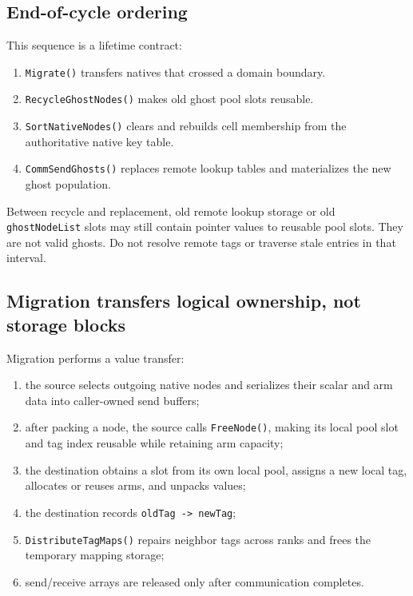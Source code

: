 \documentclass[11pt]{article}
\newcommand{\code}[1]{\texorpdfstring{\nolinkurl{#1}}{#1}}
\begin{document}
\subsection{End-of-cycle ordering}



This sequence is a lifetime contract:

\begin{enumerate}
\item \code{Migrate()} transfers natives that crossed a domain boundary.
\item \code{RecycleGhostNodes()} makes old ghost pool slots reusable.
\item \code{SortNativeNodes()} clears and rebuilds cell membership from the
authoritative native key table.
\item \code{CommSendGhosts()} replaces remote lookup tables and materializes
the new ghost population.
\end{enumerate}

Between recycle and replacement, old remote lookup storage or old
\code{ghostNodeList} slots may still contain pointer values to reusable pool
slots.  They are not valid ghosts.  Do not resolve remote tags or traverse
stale entries in that interval.

\subsection{Migration transfers logical ownership, not storage blocks}

Migration performs a value transfer:

\begin{enumerate}
\item the source selects outgoing native nodes and serializes their scalar and
arm data into caller-owned send buffers;
\item after packing a node, the source calls \code{FreeNode()}, making its
local pool slot and tag index reusable while retaining arm capacity;
\item the destination obtains a slot from its own local pool, assigns a new
local tag, allocates or reuses arms, and unpacks values;
\item the destination records \code{oldTag -> newTag};
\item \code{DistributeTagMaps()} repairs neighbor tags across ranks and frees
the temporary mapping storage;
\item send/receive arrays are released only after communication completes.
\end{enumerate}
\end{document}
